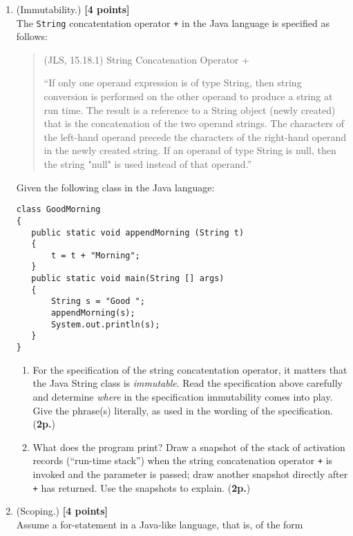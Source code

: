 \documentclass{article}
\begin{document}
\begin{enumerate}
\item (Immutability.) \hfill{\textbf{[4 points]}}
\\
The \texttt{String} concatentation operator \texttt{+} in the Java
language is specified as follows:


\begin{quote}
(JLS, 15.18.1) String Concatenation Operator +

``If only one operand expression is of type String, then string conversion is performed on the other operand to produce a string at run time. The result is a reference to a String object (newly created) that is the concatenation of the two operand strings. The characters of the left-hand operand precede the characters of the right-hand operand in the newly created string. If an operand of type String is null, then the string "null" is used instead of that operand.''
\end{quote}

 Given the following class 
in the Java language: 
{\small 
\begin{verbatim}
class GoodMorning 
{
   public static void appendMorning (String t)
   {
       t = t + "Morning";
   }
   public static void main(String [] args)
   {
       String s = "Good ";
       appendMorning(s);
       System.out.println(s);
   }
}
\end{verbatim}
}
\begin{enumerate}
\item For the specification of the string concatentation operator, it
matters that the Java String class is \textit{immutable}. Read the
specification above carefully and determine \textit{where} in the specification
immutability comes into play. Give the  phrase(s) literally, as used in 
the wording of the specification. (\textbf{2p.})
\item What does the program print? 
Draw a snapshot of the stack of activation records (``run-time stack'')
when the string concatenation operator \texttt{+} is invoked and the parameter is passed;
draw another snapshot directly after \texttt{+} has returned. 
Use the snapshots to explain. (\textbf{2p.})
\end{enumerate}


\item (Scoping.)
\hfill{\textbf{[4 points]}}
\\
Assume a for-statement in a Java-like language, that is, of the form
 

\end{enumerate}
\end{document}
